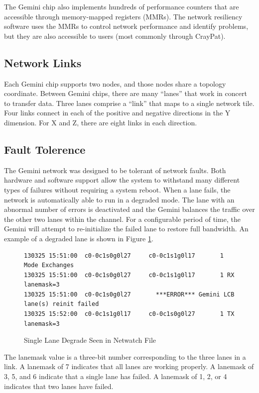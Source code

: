 \documentclass[10pt, conference, compsocconf]{IEEEtran}
\begin{document}
The Gemini chip also implements hundreds of performance counters that are
accessible through memory-mapped registers (MMRs).  The network resiliency
software uses the MMRs to control network performance and identify problems,
but they are also accessible to users (most commonly through CrayPat).

\subsection{Network Links}

Each Gemini chip supports two nodes, and those nodes share a topology
coordinate.  Between Gemini chips, there are many ``lanes'' that work in
concert to transfer data.  Three lanes comprise a ``link'' that maps to a
single network tile.  Four links connect in each of the positive and negative
directions in the Y dimension.  For X and Z, there are eight links in each
direction.

\subsection{Fault Tolerence}

The Gemini network was designed to be tolerant of network faults.  Both
hardware and software support allow the system to withstand many different
types of failures without requiring a system reboot.  When a lane fails, the
network is automatically able to run in a degraded mode.  The lane with an
abnormal number of errors is deactivated and the Gemini balances the traffic
over the other two lanes within the channel.  For a configurable period of
time, the Gemini will attempt to re-initialize the failed lane to restore full
bandwidth.  An example of a degraded lane is shown in Figure
\ref{fig:lanedegrade}. 

\begin{figure}[ht]
  \begin{verbatim}
130325 15:51:00  c0-0c1s0g0l27     c0-0c1s1g0l17       1 Mode Exchanges                       
130325 15:51:00  c0-0c1s0g0l27     c0-0c1s1g0l17       1 RX lanemask=3                        
130325 15:51:00  c0-0c1s0g0l27       ***ERROR*** Gemini LCB lane(s) reinit failed
130325 15:52:00  c0-0c1s1g0l17     c0-0c1s0g0l27       1 TX lanemask=3                       
  \end{verbatim}
  \caption{Single Lane Degrade Seen in Netwatch File}\label{fig:lanedegrade}
\end{figure}

The lanemask value is a three-bit number corresponding to the three lanes in a
link.  A lanemask of 7 indicates that all lanes are working properly.  A
lanemask of 3, 5, and 6 indicate that a single lane has failed.  A lanemask of
1, 2, or 4 indicates that two lanes have failed.
\end{document}
